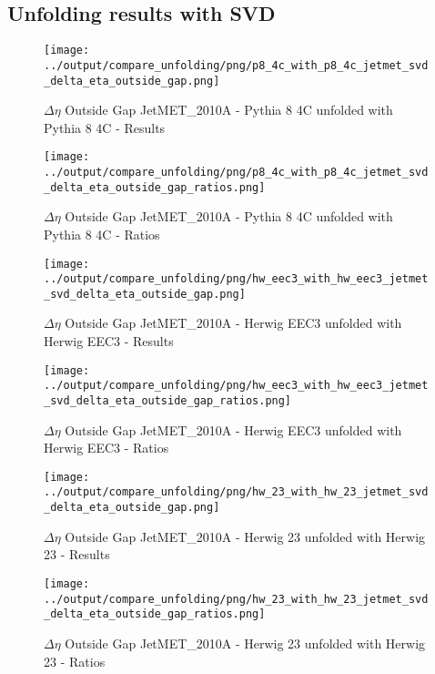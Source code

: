 \documentclass[11pt]{book}
\begin{document}
\clearpage
\subsection{Unfolding results with SVD}

\begin{figure}[ht]
\centering
\texttt{[image: ../output/compare\_unfolding/png/p8\_4c\_with\_p8\_4c\_jetmet\_svd\_delta\_eta\_outside\_gap.png]}
\caption{$\Delta\eta$ Outside Gap JetMET\_2010A - Pythia 8 4C unfolded with Pythia 8 4C - Results}
\label{p8_p8_jetmet_svd_delta_eta_outside_gap_a}
\end{figure}

\begin{figure}[ht]
\centering
\texttt{[image: ../output/compare\_unfolding/png/p8\_4c\_with\_p8\_4c\_jetmet\_svd\_delta\_eta\_outside\_gap\_ratios.png]}
\caption{$\Delta\eta$ Outside Gap JetMET\_2010A - Pythia 8 4C unfolded with Pythia 8 4C - Ratios}
\label{p8_p8_jetmet_svd_delta_eta_outside_gap_b}
\end{figure}

\begin{figure}[ht]
\centering
\texttt{[image: ../output/compare\_unfolding/png/hw\_eec3\_with\_hw\_eec3\_jetmet\_svd\_delta\_eta\_outside\_gap.png]}
\caption{$\Delta\eta$ Outside Gap JetMET\_2010A - Herwig EEC3 unfolded with Herwig EEC3 - Results}
\label{hw_eec3_hw_eec3_jetmet_svd_delta_eta_outside_gap_a}
\end{figure}

\begin{figure}[ht]
\centering
\texttt{[image: ../output/compare\_unfolding/png/hw\_eec3\_with\_hw\_eec3\_jetmet\_svd\_delta\_eta\_outside\_gap\_ratios.png]}
\caption{$\Delta\eta$ Outside Gap JetMET\_2010A - Herwig EEC3 unfolded with Herwig EEC3 - Ratios}
\label{hw_eec3_hw_eec3_jetmet_svd_delta_eta_outside_gap_b}
\end{figure}

\begin{figure}[ht]
\centering
\texttt{[image: ../output/compare\_unfolding/png/hw\_23\_with\_hw\_23\_jetmet\_svd\_delta\_eta\_outside\_gap.png]}
\caption{$\Delta\eta$ Outside Gap JetMET\_2010A - Herwig 23 unfolded with Herwig 23 - Results}
\label{hw_23_hw_23_jetmet_svd_delta_eta_outside_gap_a}
\end{figure}

\begin{figure}[ht]
\centering
\texttt{[image: ../output/compare\_unfolding/png/hw\_23\_with\_hw\_23\_jetmet\_svd\_delta\_eta\_outside\_gap\_ratios.png]}
\caption{$\Delta\eta$ Outside Gap JetMET\_2010A - Herwig 23 unfolded with Herwig 23 - Ratios}
\label{hw_23_hw_23_jetmet_svd_delta_eta_outside_gap_b}
\end{figure}
\end{document}
